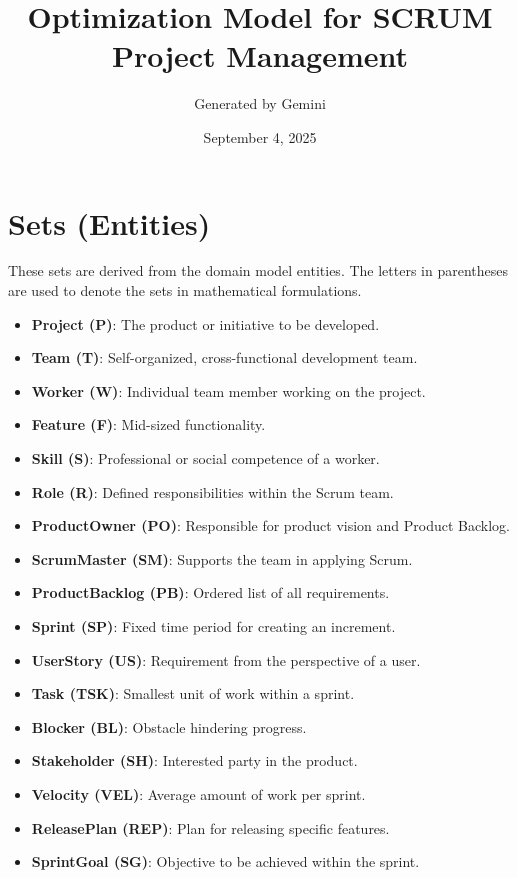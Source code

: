 \documentclass[11pt]{article}
\title{Optimization Model for SCRUM Project Management}
\author{Generated by Gemini}
\date{September 4, 2025}
\begin{document}
\maketitle
\newpage

\tableofcontents
\newpage

\section{Sets (Entities)}
These sets are derived from the domain model entities. The letters in parentheses are used to denote the sets in mathematical formulations.
\begin{itemize}
    \item \textbf{Project (P)}: The product or initiative to be developed.
    \item \textbf{Team (T)}: Self-organized, cross-functional development team.
    \item \textbf{Worker (W)}: Individual team member working on the project.
    \item \textbf{Feature (F)}: Mid-sized functionality.
    \item \textbf{Skill (S)}: Professional or social competence of a worker.
    \item \textbf{Role (R)}: Defined responsibilities within the Scrum team.
    \item \textbf{ProductOwner (PO)}: Responsible for product vision and Product Backlog.
    \item \textbf{ScrumMaster (SM)}: Supports the team in applying Scrum.
    \item \textbf{ProductBacklog (PB)}: Ordered list of all requirements.
    \item \textbf{Sprint (SP)}: Fixed time period for creating an increment.
    \item \textbf{UserStory (US)}: Requirement from the perspective of a user.
    \item \textbf{Task (TSK)}: Smallest unit of work within a sprint.
    \item \textbf{Blocker (BL)}: Obstacle hindering progress.
    \item \textbf{Stakeholder (SH)}: Interested party in the product.
    \item \textbf{Velocity (VEL)}: Average amount of work per sprint.
    \item \textbf{ReleasePlan (REP)}: Plan for releasing specific features.
    \item \textbf{SprintGoal (SG)}: Objective to be achieved within the sprint.
\end{itemize}
\newpage
\end{document}
